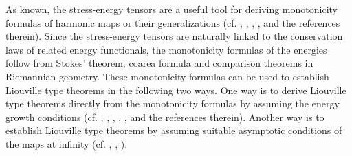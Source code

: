 \documentclass[12pt,reqno]{amsart}
\theoremstyle{definition}
\begin{document}
	As known, the stress-energy tensors are a useful tool for deriving
	monotonicity formulas of harmonic maps or their generalizations (cf. \cite{price1983amono},
	\cite{xin1986diff}, \cite{dongVanishingTheoremsVector2011a}, \cite{dlyLiou2016}, and the references therein). Since the stress-energy tensors
	are naturally linked to the conservation laws of related energy functionals,
	the monotonicity formulas of the energies follow from Stokes' theorem,
	coarea formula and comparison theorems in Riemannian geometry. These
	monotonicity formulas can be used to establish Liouville type theorems in
	the following two ways. One way is to derive Liouville type theorems
	directly from the monotonicity formulas by assuming the energy growth
	conditions (cf. \cite{sealeysome1982}, \cite{hu1984anonexist}, \cite{ll2004theenergy}, \cite{dongVanishingTheoremsVector2011a}, \cite{rs2000energy}, and the references therein).
	Another way is to establish Liouville type theorems by assuming suitable
	asymptotic conditions of the maps at infinity (cf. \cite{jin_liouville_nodate}, \cite{dlyLiou2016}, \cite{rs2000energy}).
	
\end{document}
